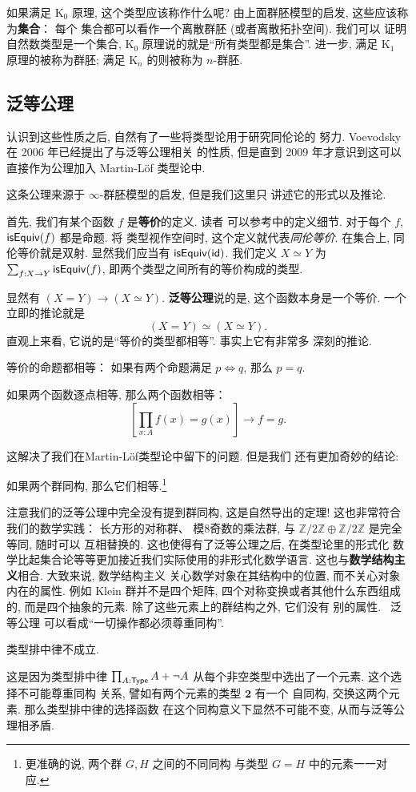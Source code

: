 如果满足 K\(_0\) 原理, 这个类型应该称作什么呢?
由上面群胚模型的启发, 这些应该称为\textbf{集合}： 每个
集合都可以看作一个离散群胚 (或者离散拓扑空间). 我们可以
证明自然数类型是一个集合,
K\(_0\) 原理说的就是“所有类型都是集合”. 进一步, 满足
K\(_1\) 原理的被称为群胚; 满足 K\(_n\) 的则被称为 \(n\)-群胚.

\subsection{泛等公理}
认识到这些性质之后, 自然有了一些将类型论用于研究同伦论的
努力. Voevodsky 在 2006 年已经提出了与泛等公理相关
的性质, 但是直到 2009 年才意识到这可以直接作为公理加入
Martin-L\"of 类型论中.

这条公理来源于 \(\infty\)-群胚模型的启发, 但是我们这里只
讲述它的形式以及推论.

首先, 我们有某个函数 \(f\) 是\textbf{等价}的定义. 读者
可以参考\cite{escardo:2018:univalence}中的定义细节.
对于每个 \(f\), \(\textnormal{\textsf{isEquiv}}(f)\) 都是命题. 将
类型视作空间时, 这个定义就代表\emph{同伦等价}. 在集合上,
同伦等价就是双射. 显然我们应当有 \(\textnormal{\textsf{isEquiv}}(\textnormal{\textsf{id}})\).
我们定义 \(X\simeq Y\) 为 \(\sum_{f : X \to Y}\textnormal{\textsf{isEquiv}}(f)\),
即两个类型之间所有的等价构成的类型.

显然有 \((X = Y) \to (X \simeq Y)\).
\textbf{泛等公理}说的是, 这个函数本身是一个等价.
一个立即的推论就是
\[(X = Y) \simeq (X \simeq Y).\]
直观上来看, 它说的是“等价的类型都相等”. 事实上它有非常多
深刻的推论.
\begin{corollary}[命题外延]
等价的命题都相等： 如果有两个命题满足
\(p \iff q\), 那么 \(p = q\).
\end{corollary}
\begin{corollary}[函数外延]
如果两个函数逐点相等, 那么两个函数相等：
\[\left[\prod_{x:A} f(x) = g(x)\right] \to f = g.\]
\end{corollary}
这解决了我们在Martin-L\"of类型论中留下的问题. 但是我们
还有更加奇妙的结论:
\begin{corollary}
如果两个群同构, 那么它们相等.\footnote{更准确的说, 两个群 \(G, H\) 之间的不同同构
与类型 \(G = H\) 中的元素一一对应.}
\end{corollary}
注意我们的泛等公理中完全没有提到群同构, 这是自然导出的定理!
这也非常符合我们的数学实践： 长方形的对称群、 模8奇数的乘法群,
与 \(\mathbb Z/2\mathbb Z \oplus
\mathbb Z/2\mathbb Z\) 是完全等同, 随时可以
互相替换的. 这也使得有了泛等公理之后, 在类型论里的形式化
数学比起集合论等等更加接近我们实际使用的非形式化数学语言.
这也与\textbf{数学结构主义}相合. 大致来说, 数学结构主义
关心数学对象在其结构中的位置, 而不关心对象内在的属性. 例如
Klein 群并不是四个矩阵, 四个对称变换或者其他什么东西组成的,
而是四个抽象的元素. 除了这些元素上的群结构之外, 它们没有
别的属性.~\cite{awodey:2013:structuralism} 泛等公理
可以看成“一切操作都必须尊重同构”.
\begin{corollary}
类型排中律不成立.
\end{corollary}
这是因为类型排中律 \(\prod_{A:\textnormal{\textsf{Type}}} A + \neg A\)
从每个非空类型中选出了一个元素. 这个选择不可能尊重同构
关系, 譬如有两个元素的类型 \(\boldsymbol 2\) 有一个
自同构, 交换这两个元素. 那么类型排中律的选择函数
在这个同构意义下显然不可能不变, 从而与泛等公理相矛盾.

